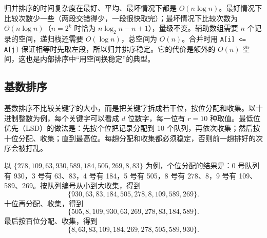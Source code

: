 归并排序的时间复杂度在最好、平均、最坏情况下都是 $O(n\log n)$。最好情况下比较次数少一些（两段交错得少，一段很快取完）；最坏情况下比较次数为 $\Theta(n\log n)$（$n=2^k$ 时恰为 $n\log_2 n-n+1$），量级不变。辅助数组需要 $n$ 个记录的空间，递归栈还需要 $O(\log n)$，总空间为 $O(n)$。合并时用 \texttt{A[i] <= A[j]} 保证相等时先取左段，所以归并排序稳定。它的代价是额外的 $O(n)$ 空间，这也是内部排序中“用空间换稳定”的典型。

\subsection{基数排序}

基数排序不比较关键字的大小，而是把关键字拆成若干位，按位分配和收集。以十进制整数为例，每个关键字可以看成 $d$ 位数字，每一位有 $r=10$ 种取值。最低位优先（LSD）的做法是：先按个位把记录分配到 10 个队列，再依次收集；然后按十位分配、收集；直到最高位。每趟分配和收集都必须稳定，否则前一趟排好的次序会被打乱。

以 $\{278,109,63,930,589,184,505,269,8,83\}$ 为例，个位分配的结果是：0 号队列有 930，3 号有 63、83，4 号有 184，5 号有 505，8 号有 278、8，9 号有 109、589、269。按队列编号从小到大收集，得到
\[
\{930,63,83,184,505,278,8,109,589,269\}.
\]
十位再分配、收集，得到
\[
\{505,8,109,930,63,269,278,83,184,589\}.
\]
最后按百位分配、收集，得到
\[
\{8,63,83,109,184,269,278,505,589,930\}.
\]

